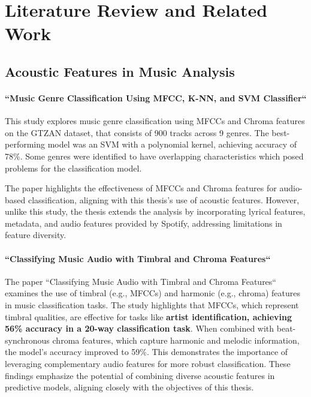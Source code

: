 \chapter{Literature Review and Related Work}
\label{cha:literaturereview}


\section{Acoustic Features in Music Analysis}
\label{sec:acousticfeaturesinmusicanalysis}

\subsubsection*{``Music Genre Classification Using MFCC, K-NN, and SVM
Classifier``}


This study explores music genre classification using MFCCs and Chroma features
on the GTZAN dataset, that consists of 900 tracks across 9 genres. The
best-performing model was an SVM with a polynomial kernel, achieving accuracy
of 78\%. Some genres were identified to have overlapping characteristics which
posed problems for the classification model.\cite{music_genre_classification_mfcc}

The paper highlights the effectiveness of MFCCs and Chroma features for
audio-based classification, aligning with this thesis's use of acoustic
features. However, unlike this study, the thesis extends the analysis by
incorporating lyrical features, metadata, and audio features provided by
Spotify, addressing limitations in feature diversity.

\subsubsection*{``Classifying Music Audio with Timbral and Chroma Features``}

The paper ``Classifying Music Audio with Timbral and Chroma Features`` examines
the use of timbral (e.g., MFCCs) and harmonic (e.g., chroma) features in music
classification tasks. The study highlights that MFCCs, which represent timbral
qualities, are effective for tasks like \textbf{artist identification, achieving 56\%
accuracy in a 20-way classification task}. When combined with beat-synchronous
chroma features, which capture harmonic and melodic information, the model's
accuracy improved to 59\%. This demonstrates the importance of leveraging
complementary audio features for more robust classification. These findings
emphasize the potential of combining diverse acoustic features in predictive
models, aligning closely with the objectives of this thesis.\cite{classifying_music_audio}



